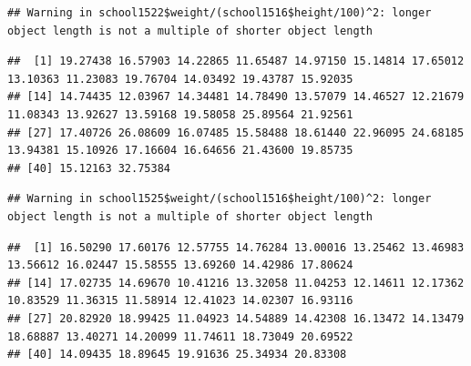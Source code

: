 \documentclass[
  12pt,
]{book}
\newenvironment{Shaded}{\begin{snugshade}}{\end{snugshade}}
\newcommand{\DecValTok}[1]{\textcolor[rgb]{0.00,0.00,0.81}{#1}}
\newcommand{\DocumentationTok}[1]{\textcolor[rgb]{0.56,0.35,0.01}{\textbf{\textit{#1}}}}
\newcommand{\NormalTok}[1]{#1}
\newcommand{\SpecialCharTok}[1]{\textcolor[rgb]{0.00,0.00,0.00}{#1}}
\begin{document}
\begin{Shaded}
\end{Shaded}

\begin{verbatim}
## Warning in school1522$weight/(school1516$height/100)^2: longer object length is not a multiple of shorter object length
\end{verbatim}

\begin{verbatim}
##  [1] 19.27438 16.57903 14.22865 11.65487 14.97150 15.14814 17.65012 13.10363 11.23083 19.76704 14.03492 19.43787 15.92035
## [14] 14.74435 12.03967 14.34481 14.78490 13.57079 14.46527 12.21679 11.08343 13.92627 13.59168 19.58058 25.89564 21.92561
## [27] 17.40726 26.08609 16.07485 15.58488 18.61440 22.96095 24.68185 13.94381 15.10926 17.16604 16.64656 21.43600 19.85735
## [40] 15.12163 32.75384
\end{verbatim}

\begin{Shaded}
\end{Shaded}

\begin{verbatim}
## Warning in school1525$weight/(school1516$height/100)^2: longer object length is not a multiple of shorter object length
\end{verbatim}

\begin{verbatim}
##  [1] 16.50290 17.60176 12.57755 14.76284 13.00016 13.25462 13.46983 13.56612 16.02447 15.58555 13.69260 14.42986 17.80624
## [14] 17.02735 14.69670 10.41216 13.32058 11.04253 12.14611 12.17362 10.83529 11.36315 11.58914 12.41023 14.02307 16.93116
## [27] 20.82920 18.99425 11.04923 14.54889 14.42308 16.13472 14.13479 18.68887 13.40271 14.20099 11.74611 18.73049 20.69522
## [40] 14.09435 18.89645 19.91636 25.34934 20.83308
\end{verbatim}
\end{document}
